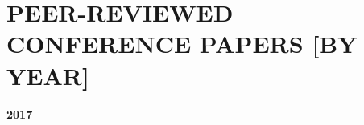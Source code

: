 \documentclass[paper=letter,fontsize=11pt]{scrartcl} %
\newcommand{\NewPart}[2]{\section*{\uppercase{#1} #2}}
\newcommand{\PaperEntry}[7]{
		\noindent #1, ``\href{#7}{#2}", \textit{#3} \textbf{#4}, #5 (#6).}
\begin{document}











\NewPart{Peer-Reviewed Conference Papers}{[BY YEAR]}

\Large \textbf{2017} \normalsize
\end{document}
